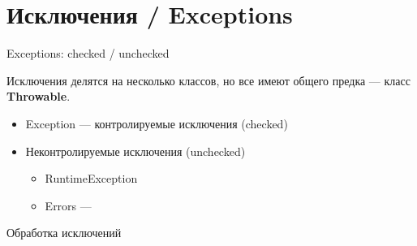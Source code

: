 \section{Исключения / Exceptions}

\begin{frame}[t]{Exceptions: checked / unchecked}

  Исключения делятся на несколько классов, но все имеют общего предка --- класс \textbf{Throwable}.

  \begin{itemize}
    \item Exception --- контролируемые исключения (checked)
    \item Неконтролируемые исключения (unchecked)
    \begin{itemize}
      \item RuntimeException 
      \item Errors --- 
    \end{itemize}
  \end{itemize}
\end{frame}


\begin{frame}[t]{Обработка исключений}



\end{frame}
